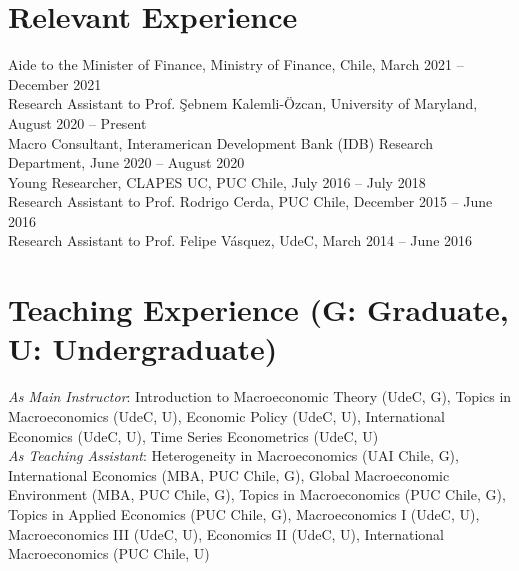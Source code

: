 \documentclass[11pt]{article}
\begin{document}




\section*{Relevant Experience}


Aide to the Minister of Finance, Ministry of Finance, Chile, March 2021 -- December 2021 \\
Research Assistant to Prof. \c{S}ebnem Kalemli-\"{O}zcan, University of Maryland, August 2020 -- Present\\
Macro Consultant, Interamerican Development Bank (IDB) Research Department, June 2020 -- August 2020\\
Young Researcher, CLAPES UC, PUC Chile, July 2016 -- July 2018\\
Research Assistant to Prof. Rodrigo Cerda, PUC Chile, December 2015 -- June 2016\\
Research Assistant to Prof. Felipe V\'asquez, UdeC, March 2014 -- June 2016



\section*{Teaching Experience (\footnotesize G: Graduate, U: Undergraduate)}

\textit{As Main Instructor}: Introduction to Macroeconomic Theory (UdeC, G), Topics in Macroeconomics (UdeC, U), Economic Policy (UdeC, U), International Economics (UdeC, U), Time Series Econometrics (UdeC, U)\\
\textit{As Teaching Assistant}: Heterogeneity in Macroeconomics (UAI Chile, G), International Economics (MBA, PUC Chile, G), Global Macroeconomic Environment (MBA, PUC Chile, G), Topics in Macroeconomics (PUC Chile, G), Topics in Applied Economics (PUC Chile, G), Macroeconomics I (UdeC, U), Macroeconomics III (UdeC, U), Economics II (UdeC, U), International Macroeconomics (PUC Chile, U)
\end{document}
